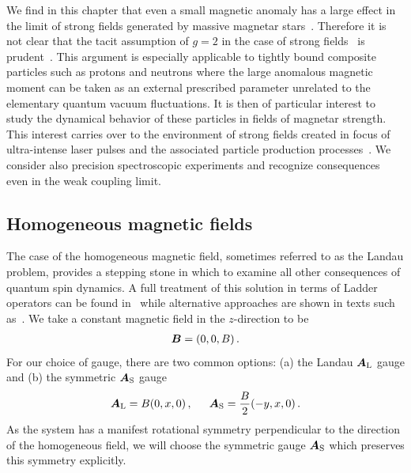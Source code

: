 We find in this chapter that even a small magnetic anomaly has a large effect in the limit of strong fields generated by massive magnetar stars~\citep{Kaspi:2017fwg}. Therefore it is not clear that the tacit assumption of $g\!=\!2$ in the case of strong fields~\citep{Rafelski:1976ts,Greiner:1985ce,Rafelski:2016ixr} is prudent~\citep{Evans:2018kor}. This argument is especially applicable to tightly bound composite particles such as protons and neutrons where the large anomalous magnetic moment can be taken as an external prescribed parameter unrelated to the elementary quantum vacuum fluctuations. It is then of particular interest to study the dynamical behavior of these particles in fields of magnetar strength. This interest carries over to the environment of strong fields created in focus of ultra-intense laser pulses and the associated particle production processes~\citep{Dunne:2014qda,Hegelich:2014tda}. We consider also precision spectroscopic experiments and recognize consequences even in the weak coupling limit.

\subsection{Homogeneous magnetic fields}
\label{sec:homogeneous}
\noindent The case of the homogeneous magnetic field, sometimes referred to as the Landau problem, provides a stepping stone in which to examine all other consequences of quantum spin dynamics. A full treatment of this solution in terms of Ladder operators can be found in~\cite{Steinmetz:2018ryf} while alternative approaches are shown in texts such as~\cite{Itzykson:1980rh}. We take a constant magnetic field in the $z$-direction to be
\begin{alignat}{1}
	\label{homogeneous:1} \boldsymbol{B}=(0,0,B)\,.
\end{alignat}
For our choice of gauge, there are two common options: (a) the Landau $\boldsymbol{A}_\mathrm{L}$ gauge and (b) the symmetric $\boldsymbol{A}_\mathrm{S}$ gauge
\begin{alignat}{1}
	\label{homogeneous:2} \bb{A}_\mathrm{L}=B(0,x,0)\,,\indent \bb{A}_\mathrm{S}=\frac{B}{2}(-y,x,0)\,.
\end{alignat}
As the system has a manifest rotational symmetry perpendicular to the direction of the homogeneous field, we will choose the symmetric gauge $\boldsymbol{A}_\mathrm{S}$ which preserves this symmetry explicitly.

